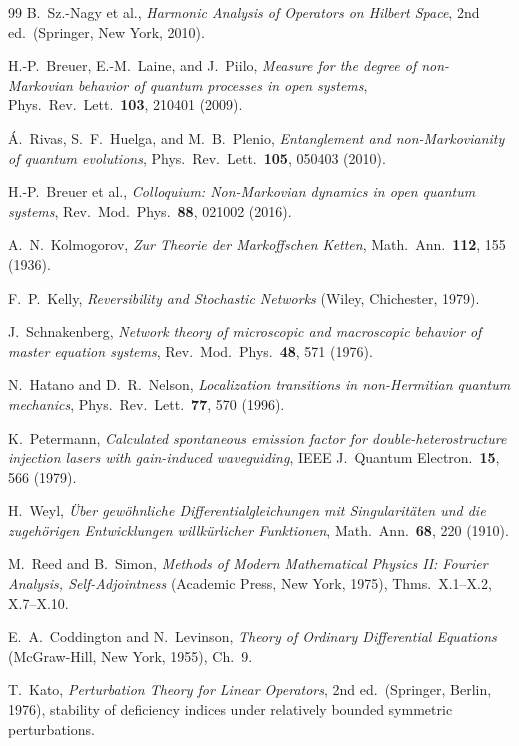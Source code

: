 \documentclass[11pt]{article}
\theoremstyle{definition}
\theoremstyle{remark}
\begin{document}
\begin{thebibliography}{99}
B.~Sz.-Nagy et al.,
\emph{Harmonic Analysis of Operators on Hilbert Space},
2nd ed.\ (Springer, New York, 2010).

H.-P.~Breuer, E.-M.~Laine, and J.~Piilo,
\emph{Measure for the degree of non-Markovian behavior of quantum
processes in open systems},
Phys.\ Rev.\ Lett.\ \textbf{103}, 210401 (2009).

\'A.~Rivas, S.~F.~Huelga, and M.~B.~Plenio,
\emph{Entanglement and non-Markovianity of quantum evolutions},
Phys.\ Rev.\ Lett.\ \textbf{105}, 050403 (2010).

H.-P.~Breuer et al.,
\emph{Colloquium: Non-Markovian dynamics in open quantum systems},
Rev.\ Mod.\ Phys.\ \textbf{88}, 021002 (2016).

A.~N.~Kolmogorov,
\emph{Zur Theorie der Markoffschen Ketten},
Math.\ Ann.\ \textbf{112}, 155 (1936).

F.~P.~Kelly,
\emph{Reversibility and Stochastic Networks}
(Wiley, Chichester, 1979).

J.~Schnakenberg,
\emph{Network theory of microscopic and macroscopic behavior of master
equation systems},
Rev.\ Mod.\ Phys.\ \textbf{48}, 571 (1976).

N.~Hatano and D.~R.~Nelson,
\emph{Localization transitions in non-Hermitian quantum mechanics},
Phys.\ Rev.\ Lett.\ \textbf{77}, 570 (1996).

K.~Petermann,
\emph{Calculated spontaneous emission factor for double-heterostructure
injection lasers with gain-induced waveguiding},
IEEE J.\ Quantum Electron.\ \textbf{15}, 566 (1979).

H.~Weyl,
\emph{\"Uber gew\"ohnliche Differentialgleichungen mit Singularit\"aten
und die zugeh\"origen Entwicklungen willk\"urlicher Funktionen},
Math.\ Ann.\ \textbf{68}, 220 (1910).

M.~Reed and B.~Simon,
\emph{Methods of Modern Mathematical Physics II: Fourier Analysis,
Self-Adjointness}
(Academic Press, New York, 1975), Thms.\ X.1--X.2, X.7--X.10.

E.~A.~Coddington and N.~Levinson,
\emph{Theory of Ordinary Differential Equations}
(McGraw-Hill, New York, 1955), Ch.~9.

T.~Kato,
\emph{Perturbation Theory for Linear Operators},
2nd ed.\ (Springer, Berlin, 1976), stability of deficiency indices under
relatively bounded symmetric perturbations.


\end{thebibliography}
\end{document}
